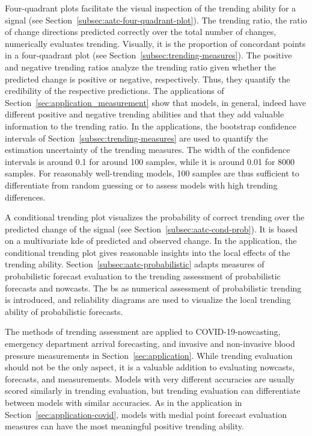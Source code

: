 \documentclass[pdflatex]{sn-jnl}
\theoremstyle{plain}%
\theoremstyle{definition}
\begin{document}
Four-quadrant plots facilitate the visual inspection of the trending ability for a signal (see Section~\ref{subsec:aatc-four-quadrant-plot}).
The trending ratio, the ratio of change directions predicted correctly over the total number of changes, numerically evaluates trending.
Visually, it is the proportion of concordant points in a four-quadrant plot (see Section~\ref{subsec:trending-measures}).
The positive and negative trending ratios analyze the trending ratio given whether the predicted change is positive or negative, respectively.
Thus, they quantify the credibility of the respective predictions.
The applications of Section~\ref{sec:application_measurement} show that models, in general, indeed have different positive and negative trending abilities and that they add valuable information to the trending ratio.
In the applications, the bootstrap confidence intervals of Section~\ref{subsec:trending-measures} are used to quantify the estimation uncertainty of the trending measures.
The width of the confidence intervals is around 0.1 for around 100 samples, while it is around 0.01 for 8000 samples.
For reasonably well-trending models, 100 samples are thus sufficient to differentiate from random guessing or to assess models with high trending differences.

A conditional trending plot visualizes the probability of correct trending over the predicted change of the signal (see Section~\ref{subsec:aatc-cond-prob}).
It is based on a multivariate \acf{kde} of predicted and observed change.
In the application, the conditional trending plot gives reasonable insights into the local effects of the trending ability.
Section~\ref{subsec:aatc-probabilistic} adapts measures of probabilistic forecast evaluation to the trending assessment of probabilistic forecasts and nowcasts.
The \acf{bs} as numerical assessment of probabilistic trending is introduced, and reliability diagrams are used to visualize the local trending ability of probabilistic forecasts.

The methods of trending assessment are applied to COVID-19-nowcasting, emergency department arrival forecasting, and invasive and non-invasive blood pressure measurements in Section~\ref{sec:application}.
While trending evaluation should not be the only aspect, it is a valuable addition to evaluating nowcasts, forecasts, and measurements.
Models with very different accuracies are usually scored similarly in trending evaluation, but trending evaluation can differentiate between models with similar accuracies.
As in the application in Section~\ref{sec:application-covid}, models with medial point forecast evaluation measures can have the most meaningful positive trending ability.
\end{document}

